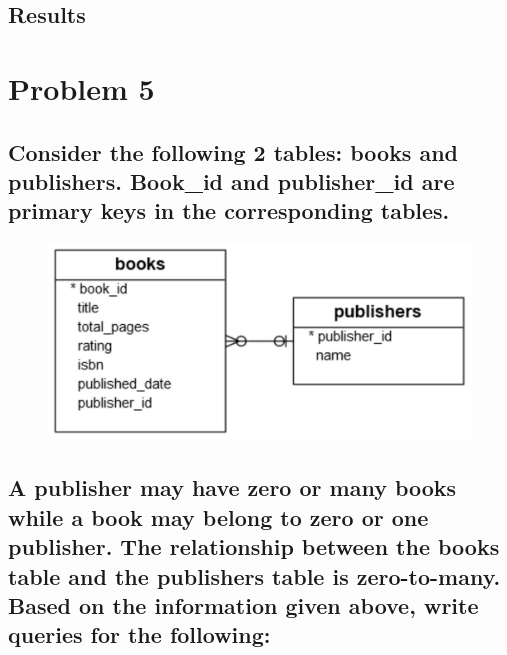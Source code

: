 \documentclass[12pt]{article}
\begin{document}
\subsection{Results}

\newpage


\section{Problem 5}

\subsection*{Consider the following 2 tables: books and publishers. Book\_id and publisher\_id are primary keys in the corresponding tables.} 

\begin{figure}[!hbt]
    \centering
    \includegraphics[scale=0.8]{screenshots/problem5.png}
    \label{fig:my_label1}
\end{figure}

\subsection*{A publisher may have zero or many books while a book may belong to zero or one publisher. The relationship between the books table and the publishers table is zero-to-many.
Based on the information given above, write queries for the following: }
\end{document}
